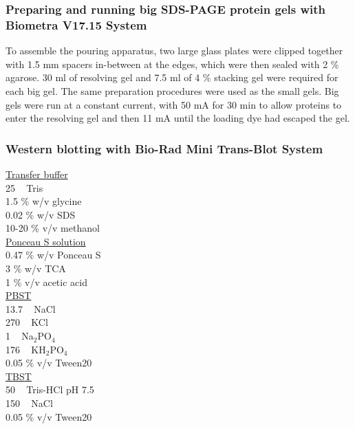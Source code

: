 
\subsubsection{Preparing and running big SDS-PAGE protein gels with Biometra V17.15 System}

To assemble the pouring apparatus, two large glass plates were clipped together with 1.5 \si{\milli\metre} spacers in-between at the edges, which were then sealed with 2 \% agarose. 30 \si{\milli\litre} of resolving gel and 7.5 \si{\milli\litre} of 4 \% stacking gel were required for each big gel. The same preparation procedures were used as the small gels. Big gels were run at a constant current, with 50 \si{\milli\ampere} for 30 \si{\minute} to allow proteins to enter the resolving gel and then 11 \si{\milli\ampere} until the loading dye had escaped the gel.

\subsubsection{Western blotting with Bio-Rad Mini Trans-Blot System}

\underline{Transfer buffer} \\
25 \si{\milli\Molar} Tris \\
1.5 \% w/v glycine\\
0.02 \% w/v SDS\\
10-20 \% v/v methanol\\

\underline{Ponceau S solution}\\
0.47 \% w/v Ponceau S \\
3 \% w/v TCA \\
1 \% v/v acetic acid \\

\underline{PBST}\\
13.7 \si{\milli\Molar} NaCl\\
270 \si{\micro\Molar} KCl\\
1 \si{\milli\Molar} Na$_{2}$PO$_{4}$\\
176 \si{\micro\Molar} KH$_{2}$PO$_{4}$\\
0.05 \% v/v Tween20\\

\underline{TBST}\\
50 \si{\milli\Molar} Tris-HCl pH 7.5\\
150 \si{\milli\Molar} NaCl\\
0.05 \% v/v Tween20\\


